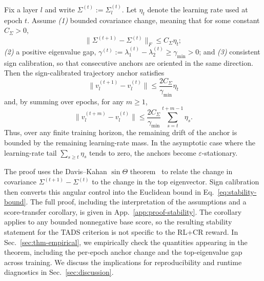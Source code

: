 \begin{theorem}
\label{thm:stability}
Fix a layer $l$ and write $\Sigma^{(t)} := \Sigma_l^{(t)}$. Let
$\eta_t$ denote the learning rate used at epoch $t$. Assume
\emph{(1)} bounded covariance change, meaning that for some
constant $C_\Sigma>0$,
\[
  \|\Sigma^{(t+1)}-\Sigma^{(t)}\|_F
  \le
  C_\Sigma \eta_t ;
\]
\emph{(2)} a positive eigenvalue gap,
$\gamma^{(t)} := \lambda_1^{(t)}-\lambda_2^{(t)}
\ge \gamma_{\min}>0$; and \emph{(3)} consistent sign calibration,
so that consecutive anchors are oriented in the same direction.
Then the sign-calibrated trajectory anchor satisfies
\begin{equation}
  \boxed{
  \bigl\|v_l^{(t+1)}-v_l^{(t)}\bigr\|
  \le
  \frac{2C_\Sigma}{\gamma_{\min}}\eta_t
  }
  \label{eq:stability-bound}
\end{equation}
and, by summing over epochs, for any $m\ge1$,
\begin{equation}
  \bigl\|v_l^{(t+m)}-v_l^{(t)}\bigr\|
  \le
  \frac{2C_\Sigma}{\gamma_{\min}}
  \sum_{s=t}^{t+m-1}\eta_s .
  \label{eq:cumulative-bound}
\end{equation}
Thus, over any finite training horizon, the remaining drift of the
anchor is bounded by the remaining learning-rate mass. In the
asymptotic case where the learning-rate tail
$\sum_{s\ge t}\eta_s$ tends to zero, the anchors become
$\varepsilon$-stationary.
\end{theorem}

The proof uses the Davis--Kahan $\sin\Theta$
theorem~\cite{daviskahan} to relate the change in covariance
$\Sigma^{(t+1)}-\Sigma^{(t)}$ to the change in the top eigenvector.
Sign calibration then converts this angular control into the
Euclidean bound in Eq.~\ref{eq:stability-bound}. The full proof,
including the interpretation of the assumptions and a score-transfer
corollary, is given in App.~\ref{app:proof-stability}. The corollary
applies to any bounded nonnegative base score, so the resulting
stability statement for the \textsc{TADS} criterion is not specific
to the RL+CR reward. In Sec.~\ref{sec:thm-empirical}, we empirically
check the quantities appearing in the theorem, including the
per-epoch anchor change and the top-eigenvalue gap across training.
We discuss the implications for reproducibility and runtime
diagnostics in Sec.~\ref{sec:discussion}.


 

